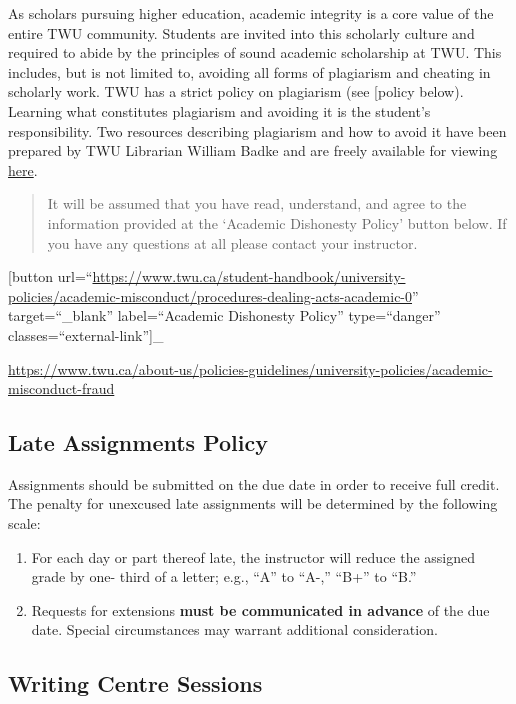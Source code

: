 \documentclass[
]{book}
\providecommand{\tightlist}{%
  \setlength{\itemsep}{0pt}\setlength{\parskip}{0pt}}
\begin{document}
As scholars pursuing higher education, academic integrity is a core value of the entire TWU community. Students are invited into this scholarly culture and required to abide by the principles of sound academic scholarship at TWU. This includes, but is not limited to, avoiding all forms of plagiarism and cheating in scholarly work. TWU has a strict policy on plagiarism (see {[}policy below). Learning what constitutes plagiarism and avoiding it is the student's responsibility. Two resources describing plagiarism and how to avoid it have been prepared by TWU Librarian William Badke and are freely available for viewing \href{https://vimeo.com/163566887/bece097c99}{here}.

\begin{quote}
It will be assumed that you have read, understand, and agree to the information provided at the `Academic Dishonesty Policy' button below. If you have any questions at all please contact your instructor.
\end{quote}

{[}button url=``\url{https://www.twu.ca/student-handbook/university-policies/academic-misconduct/procedures-dealing-acts-academic-0}'' target=``\_blank'' label=``Academic Dishonesty Policy'' type=``danger'' classes=``external-link''{]}\_

\url{https://www.twu.ca/about-us/policies-guidelines/university-policies/academic-misconduct-fraud}

\hypertarget{late-assignments-policy}{%
\subsection{Late Assignments Policy}\label{late-assignments-policy}}

Assignments should be submitted on the due date in order to receive full credit. The penalty for unexcused late assignments will be determined by the following scale:

\begin{enumerate}
\def\labelenumi{\arabic{enumi}.}
\tightlist
\item
  For each day or part thereof late, the instructor will reduce the assigned grade by one- third of a letter; e.g., ``A'' to ``A-,'' ``B+'' to ``B.''
\item
  Requests for extensions \textbf{must be communicated in advance} of the due date. Special circumstances may warrant additional consideration.
\end{enumerate}

\hypertarget{writing-centre-sessions}{%
\subsection{Writing Centre Sessions}\label{writing-centre-sessions}}
\end{document}
